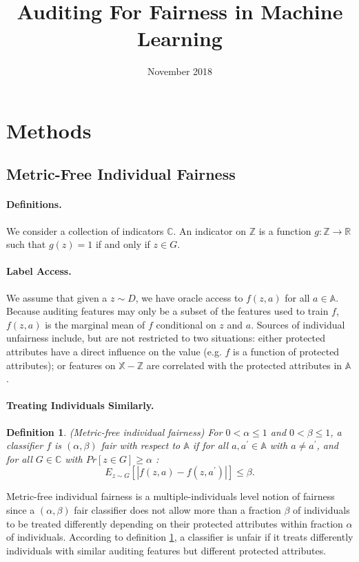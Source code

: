 \documentclass{article}
\title{Auditing For Fairness in Machine Learning}
\author{}
\date{November 2018}
\newtheorem{defn}{Definition}[section]
\begin{document}
\maketitle

\section{Methods}
\subsection{Metric-Free Individual Fairness}

\paragraph{Definitions.}
We consider a collection of indicators $\mathbb{C}$. An indicator on $\mathbb{Z}$ is a function $g: \mathbb{Z} \rightarrow \mathbb{R}$ such that $g(z) =1$ if and only if $z\in G$.

\paragraph{Label Access.}
We assume that given a $z\sim D$, we have oracle access to $f(z,a)$ for all $a\in \mathbb{A}$. Because auditing features may only be a subset of the features used to train $f$, $f(z,a)$ is the marginal mean of $f$ conditional on $z$ and $a$. 
Sources of individual unfairness include, but are not restricted to two situations:  either protected attributes have a direct influence on the value (e.g. $f$ is a function of protected attributes); or features on $\mathbb{X}-\mathbb{Z}$ are correlated with the protected attributes in $\mathbb{A}$.  

\paragraph{Treating Individuals Similarly.}
\begin{defn}(Metric-free individual fairness)
\label{def: mfif}
For $0<\alpha \leq 1$ and $0< \beta \leq 1$, a classifier $f$ is $(\alpha, \beta)$ fair with respect to $\mathbb{A}$ if for all $a, a^{'}\in \mathbb{A}$ with $a\neq a^{'}$, and for all $G\in \mathbb{C}$ with $Pr[z\in G] \geq \alpha$ :
$$  E_{z\sim G}[|f(z, a) - f(z, a^{'})|] \leq \beta.$$
\end{defn}

Metric-free individual fairness is a multiple-individuals level notion of fairness since a $(\alpha, \beta)$ fair classifier does not allow more than a fraction $\beta$ of individuals to be treated differently depending on their protected attributes within fraction $\alpha$ of individuals. According to definition \ref{def: mfif}, a classifier is unfair if it treats differently individuals with similar auditing features but different protected attributes. 
\end{document}
